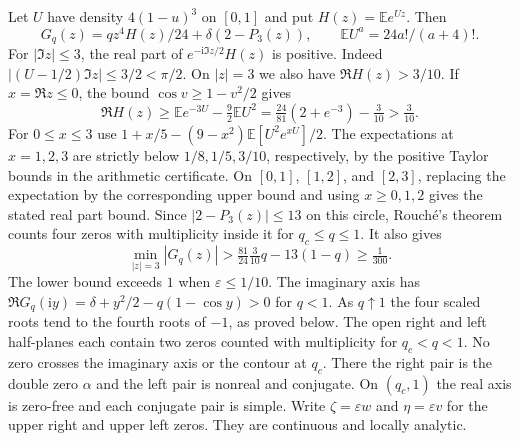 \documentclass[11pt]{article}
\newcommand{\e}{\varepsilon}
\newcommand{\E}{\mathbb E}
\newcommand{\ip}{\mathrm i}
\begin{document}
Let $U$ have density $4(1-u)^3$ on $[0,1]$ and put $H(z)=\E e^{Uz}$.
Then
\begin{equation}\label{eq:Gsplit}
 G_q(z)=qz^4H(z)/24+\delta(2-P_3(z)),\qquad
 \E U^a=24a!/(a+4)! .
\end{equation}
For $|\Im z|\le3$, the real part of
$e^{-\ip\Im z/2}H(z)$ is positive. Indeed
$|(U-1/2)\Im z|\le3/2<\pi/2$. On $|z|=3$ we also have
$\Re H(z)>3/10$. If $x=\Re z\le0$, the bound
$\cos v\ge1-v^2/2$ gives
\[
 \Re H(z)\ge\E e^{-3U}-\tfrac92\E U^2
 =\tfrac{24}{81}(2+e^{-3})-\tfrac3{10}>\tfrac3{10}.
\]
For $0\le x\le3$ use $1+x/5-(9-x^2)\E[U^2e^{xU}]/2$.
The expectations at $x=1,2,3$ are strictly below $1/8,1/5,3/10$,
respectively, by the positive Taylor bounds in the arithmetic
certificate. On $[0,1]$, $[1,2]$, and $[2,3]$, replacing the
expectation by the corresponding upper bound and using
$x\ge0,1,2$ gives the stated real part bound.
Since $|2-P_3(z)|\le13$ on this circle, Rouch\'e's theorem counts
four zeros with multiplicity inside it for $q_c\le q\le1$.
It also gives
\begin{equation}\label{eq:circle}
 \min_{|z|=3}|G_q(z)|>
 \tfrac{81}{24}\tfrac{3}{10}q-13(1-q)\ge \tfrac1{300}.
\end{equation}
The lower bound exceeds $1$ when $\e\le1/10$.
The imaginary axis has
$\Re G_q(\ip y)=\delta+y^2/2-q(1-\cos y)>0$ for $q<1$.
As $q\uparrow1$ the four scaled roots tend to the fourth roots
of $-1$, as proved below. The open right and left half-planes
each contain two zeros counted with multiplicity for $q_c<q<1$.
No zero crosses the imaginary axis or the contour at $q_c$.
There the right pair is the double zero $\alpha$ and the left
pair is nonreal and conjugate. On $(q_c,1)$ the real axis is
zero-free and each conjugate pair is simple. Write $\zeta=\e w$
and $\eta=\e v$ for the upper right and upper left zeros. They
are continuous and locally analytic.
\end{document}
